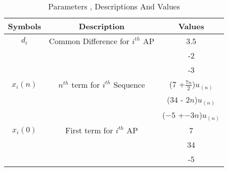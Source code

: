 \begin{table}[ht!]
\centering
\begin{tabular}{ |c|c|c| } 
 \hline
Symbols & Description & Values  \\
 \hline
$d_i$ & Common Difference for $i^{th}$ AP & 3.5 \\ \cline{3-3}
 & & -2 \\ \cline{3-3}
 & & -3 \\ 
\hline

  $x_i(n)$ & $n^{th}$ term for $i^{th}$ Sequence &  ($7$ +$\frac{7n}{2}$)$u_{(n)}$\\ \cline{3-3}
 & &  ($34$ - $2n$)$u_{(n)}$ \\ \cline{3-3}
 & &  ($-5$ +$-3n$)$u_{(n)}$ \\ 
\hline


  $x_i(0)$ & First term for $i^{th}$ AP & 7 \\ \cline{3-3}
 & & 34 \\ \cline{3-3}
 & & -5 \\ 
\hline
  
   \hline
\end{tabular}
\caption{Parameters , Descriptions And Values }
\label{table:ee25-tab1}
\end{table}

